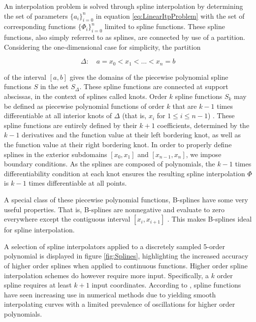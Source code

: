 An interpolation problem is solved through spline interpolation by determining the set of parameters $\{a_i\}_{i=0}^n$ in equation \eqref{eq:LinearItpProblem} with the set of corresponding functions $\{\Phi_i\}_{i=0}^n$ limited to spline functions. These spline functions, also simply referred to as splines, are connected by use of a partition. Considering the one-dimensional case for simplicity, the partition

\begin{equation}
	\Delta:\quad a=x_0<x_1<...<x_n=b
\end{equation}

\noindent of the interval $[a,b]$ gives the domains of the piecewise polynomial spline functions $S$ in the set $S_{\Delta}$. These spline functions are connected at support abscissas, in the context of splines called knots. Order $k$ spline functions $S_k$ may be defined as piecewise polynomial functions of order $k$ that are $k-1$ times differentiable at all interior knots of $\Delta$ (that is, $x_i$ for $1\leq i\leq n-1$) \citep{NumericalAnalysis}. These spline functions are entirely defined by their $k+1$ coefficients, determined by the $k-1$ derivatives and the function value at their left bordering knot, as well as the function value at their right bordering knot. In order to properly define splines in the exterior subdomains $[x_0,x_1]$ and $[x_{n-1},x_n]$, we impose boundary conditions. As the splines are composed of polynomials, the $k-1$ times differentiability condition at each knot ensures the resulting spline interpolation $\Phi$ is $k-1$ times differentiable at all points. 

A special class of these piecewise polynomial functions, B-splines have some very useful properties. That is, B-splines are nonnegative and evaluate to zero everywhere except the contiguous interval $[x_i,x_{i+1}]$ \citep{NumericalAnalysis}. This makes B-splines ideal for spline interpolation.

A selection of spline interpolators applied to a discretely sampled 5-order polynomial is displayed in figure \ref{fig:Splines}, highlighting the increased accuracy of higher order splines when applied to continuous functions. Higher order spline interpolation schemes do however require more input. Specifically, a $k$ order spline requires at least $k+1$ input coordinates. According to \cite{NumericalAnalysis}, spline functions have seen increasing use in numerical methods due to yielding smooth interpolating curves with a limited prevalence of oscillations for higher order polynomials.

